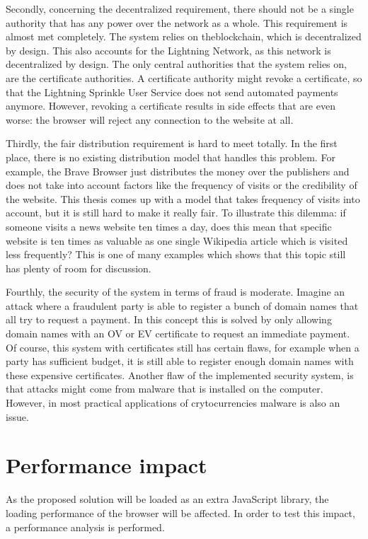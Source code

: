 Secondly, concerning the decentralized requirement, there should not be a single authority that has any power over the network as a whole. This requirement is almost met completely. The system relies on theblockchain, which is decentralized by design. This also accounts for the Lightning Network, as this network is decentralized by design. The only central authorities that the system relies on, are the certificate authorities. A certificate authority might revoke a certificate, so that the Lightning Sprinkle User Service does not send automated payments anymore. However, revoking a certificate results in side effects that are even worse: the browser will reject any connection to the website at all.

Thirdly, the fair distribution requirement is hard to meet totally. In the first place, there is no existing distribution model that handles this problem. For example, the Brave Browser just distributes the money over the publishers and does not take into account factors like the frequency of visits or the credibility of the website. This thesis comes up with a model that takes frequency of visits into account, but it is still hard to make it really fair. To illustrate this dilemma: if someone visits a news website ten times a day, does this mean that specific website is ten times as valuable as one single Wikipedia article which is visited less frequently? This is one of many examples which shows that this topic still has plenty of room for discussion. 


Fourthly, the security of the system in terms of fraud is moderate. Imagine an attack where a fraudulent party is able to register a bunch of domain names that all try to request a payment. In this concept this is solved by only allowing domain names with an OV or EV certificate to request an immediate payment. Of course, this system with certificates still has certain flaws, for example when a party has sufficient budget, it is still able to register enough domain names with these expensive certificates. Another flaw of the implemented security system, is that attacks might come from malware that is installed on the computer. However, in most practical applications of crytocurrencies malware is also an issue.


\section{Performance impact}
As the proposed solution will be loaded as an extra JavaScript library, the loading performance of the browser will be affected. In order to test this impact, a performance analysis is performed.

